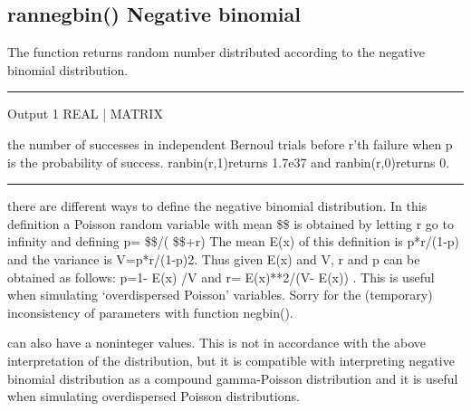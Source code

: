 \subsection{\textcolor{VioletRed}{rannegbin}() Negative binomial}
\label{rannegbin}
The  function  returns  random  number  distributed  according to the
negative binomial distribution.
\vspace{0.3cm}
\hrule
\vspace{0.3cm}
\noindent Output \tabto{3cm} 1 \tabto{5cm}  REAL | MATRIX  \tabto{7cm}
\begin{changemargin}{3cm}{0cm}
\noindent  the number of successes in
independent Bernoul trials before r’th failure when
p is the probability of success. \textcolor{VioletRed}{ranbin}(r,1)returns 1.7e37 and
\textcolor{VioletRed}{ranbin}(r,0)returns 0.
\end {changemargin}
\hrule
\vspace{0.2cm}

\begin{note}
there are different ways to define the negative binomial distribution. In this definition
a Poisson random variable with mean \$\lamda\$ is obtained by letting r go
to infinity and defining p= \$\lamda\$/( \$\lamda\$+r)
The mean E(x) of this definition is p*r/(1-p) and the variance is V=p*r/(1-p)2. Thus given
E(x) and V, r and p can be obtained as follows: p=1- E(x) /V and r= E(x)**2/(V- E(x)) . This is useful when
simulating ‘overdispersed Poisson’ variables. Sorry for the (temporary) inconsistency of parameters with
function \textcolor{VioletRed}{negbin}().
\end{note}
\begin{note}
can also have a noninteger values. This is not in accordance with the above
interpretation of the distribution, but it is compatible with interpreting negative binomial
distribution as a compound gamma-Poisson distribution and it is useful when simulating
overdispersed Poisson distributions.
\end{note}
